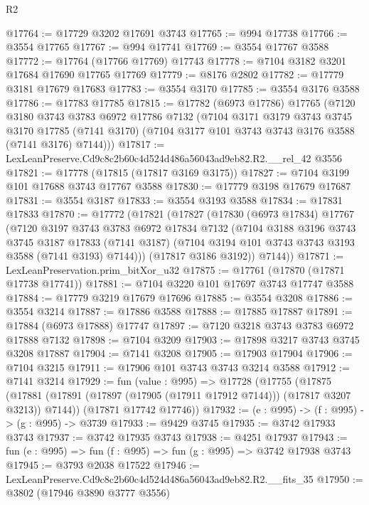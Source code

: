 \begin{lexlean}{R2}
\begin{coremodule}
@17764 := @17729 @3202 @17691 @3743
@17765 := @994 @17738
@17766 := @3554 @17765
@17767 := @994 @17741
@17769 := @3554 @17767 @3588
@17772 := @17764 (@17766 @17769) @17743
@17778 := @7104 @3182 @3201 @17684 @17690 @17765 @17769
@17779 := @8176 @2802
@17782 := @17779 @3181 @17679 @17683
@17783 := @3554 @3170
@17785 := @3554 @3176 @3588
@17786 := @17783 @17785
@17815 := @17782
    (@6973 @17786)
    @17765
    (@7120
      @3180
      @3743
      @3783
      @6972
      @17786
      @7132
      (@7104
        @3171
        @3179
        @3743
        @3745
        @3170
        @17785
        (@7141 @3170)
        (@7104 @3177 @101 @3743 @3743 @3176 @3588 (@7141 @3176) @7144)))
@17817 := LexLeanPreserve.Cd9c8c2b60c4d524d486a56043ad9eb82.R2.__rel_42 @3556
@17821 := @17778 (@17815 (@17817 @3169 @3175))
@17827 := @7104 @3199 @101 @17688 @3743 @17767 @3588
@17830 := @17779 @3198 @17679 @17687
@17831 := @3554 @3187
@17833 := @3554 @3193 @3588
@17834 := @17831 @17833
@17870 := @17772
    (@17821
      (@17827
        (@17830
          (@6973 @17834)
          @17767
          (@7120
            @3197
            @3743
            @3783
            @6972
            @17834
            @7132
            (@7104
              @3188
              @3196
              @3743
              @3745
              @3187
              @17833
              (@7141 @3187)
              (@7104 @3194 @101 @3743 @3743 @3193 @3588 (@7141 @3193) @7144)))
          (@17817 @3186 @3192))
        @7144))
@17871 := LexLeanPreservation.prim_bitXor_u32
@17875 := @17761 (@17870 (@17871 @17738 @17741))
@17881 := @7104 @3220 @101 @17697 @3743 @17747 @3588
@17884 := @17779 @3219 @17679 @17696
@17885 := @3554 @3208
@17886 := @3554 @3214
@17887 := @17886 @3588
@17888 := @17885 @17887
@17891 := @17884 (@6973 @17888) @17747
@17897 := @7120 @3218 @3743 @3783 @6972 @17888 @7132
@17898 := @7104 @3209
@17903 := @17898 @3217 @3743 @3745 @3208 @17887
@17904 := @7141 @3208
@17905 := @17903 @17904
@17906 := @7104 @3215
@17911 := @17906 @101 @3743 @3743 @3214 @3588
@17912 := @7141 @3214
@17929 := fun (value : @995) =>
  @17728
    (@17755
      (@17875 (@17881 (@17891 (@17897 (@17905 (@17911 @17912 @7144))) (@17817 @3207 @3213)) @7144))
      (@17871 @17742 @17746))
@17932 := (e : @995) -> (f : @995) -> (g : @995) -> @3739
@17933 := @9429 @3745
@17935 := @3742 @17933 @3743
@17937 := @3742 @17935 @3743
@17938 := @4251 @17937
@17943 := fun (e : @995) => fun (f : @995) => fun (g : @995) => @3742 @17938 @3743
@17945 := @3793 @2038 @17522
@17946 := LexLeanPreserve.Cd9c8c2b60c4d524d486a56043ad9eb82.R2.__fits_35
@17950 := @3802 (@17946 @3890 @3777 @3556)

\end{coremodule}
\end{lexlean}

